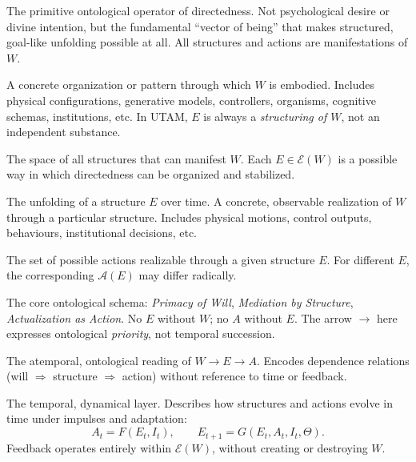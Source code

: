 \documentclass[12pt,a4paper]{report}
\newcommand{\Will}{W}
\begin{document}
\begin{description}[leftmargin=2.5cm,style=nextline]

    \item[\textbf{Will} (\(W\))] 
    The primitive ontological operator of directedness. Not psychological desire or divine intention, but the fundamental ``vector of being'' that makes structured, goal-like unfolding possible at all. All structures and actions are manifestations of \(\Will\).

    \item[\textbf{Structure} (\(E\))] 
    A concrete organization or pattern through which \(\Will\) is embodied. Includes physical configurations, generative models, controllers, organisms, cognitive schemas, institutions, etc. In UTAM, \(E\) is always a \emph{structuring of \(\Will\)}, not an independent substance.

    \item[\(\mathcal{E}(\Will)\) (Structure space)] 
    The space of all structures that can manifest \(\Will\). Each \(E \in \mathcal{E}(\Will)\) is a possible way in which directedness can be organized and stabilized.

    \item[\textbf{Action} (\(A\))] 
    The unfolding of a structure \(E\) over time. A concrete, observable realization of \(\Will\) through a particular structure. Includes physical motions, control outputs, behaviours, institutional decisions, etc.

    \item[\(\mathcal{A}(E)\) (Action space)] 
    The set of possible actions realizable through a given structure \(E\). For different \(E\), the corresponding \(\mathcal{A}(E)\) may differ radically.

    \item[\textbf{UTAM axiom} (\(W \to E \to A\))] 
    The core ontological schema: \emph{Primacy of Will}, \emph{Mediation by Structure}, \emph{Actualization as Action}. No \(E\) without \(W\); no \(A\) without \(E\). The arrow \(\to\) here expresses ontological \emph{priority}, not temporal succession.

    \item[\textbf{Vertical UTAM}] 
    The atemporal, ontological reading of \(W \to E \to A\). Encodes dependence relations (will $\Rightarrow$ structure $\Rightarrow$ action) without reference to time or feedback.

    \item[\textbf{Horizontal UTAM}] 
    The temporal, dynamical layer. Describes how structures and actions evolve in time under impulses and adaptation:
    \[
        A_t = F(E_t, I_t), \qquad
        E_{t+1} = G(E_t, A_t, I_t, \Theta).
    \]
    Feedback operates entirely within \(\mathcal{E}(\Will)\), without creating or destroying \(\Will\).


\end{description}
\end{document}

